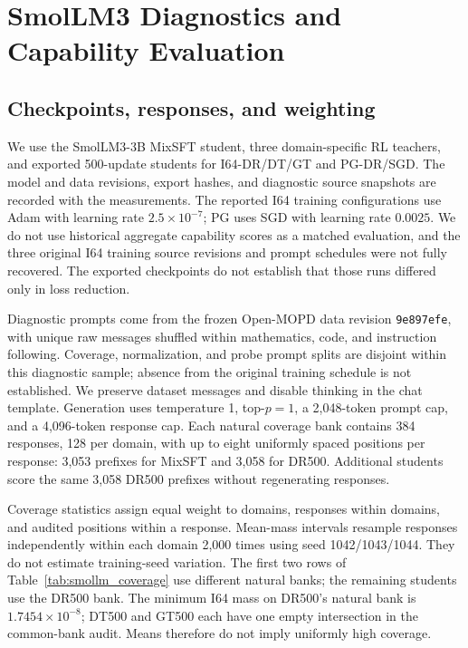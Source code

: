 \section{SmolLM3 Diagnostics and Capability Evaluation}
\label{app:smollm_diagnostics}

\subsection{Checkpoints, responses, and weighting}

We use the SmolLM3-3B MixSFT student, three domain-specific RL teachers, and exported 500-update students for I64-DR/DT/GT and PG-DR/SGD. The model and data revisions, export hashes, and diagnostic source snapshots are recorded with the measurements. The reported I64 training configurations use Adam with learning rate $2.5\times10^{-7}$; PG uses SGD with learning rate $0.0025$. We do not use historical aggregate capability scores as a matched evaluation, and the three original I64 training source revisions and prompt schedules were not fully recovered. The exported checkpoints do not establish that those runs differed only in loss reduction.

Diagnostic prompts come from the frozen Open-MOPD data revision \texttt{9e897efe}, with unique raw messages shuffled within mathematics, code, and instruction following. Coverage, normalization, and probe prompt splits are disjoint within this diagnostic sample; absence from the original training schedule is not established. We preserve dataset messages and disable thinking in the chat template. Generation uses temperature 1, top-$p=1$, a 2,048-token prompt cap, and a 4,096-token response cap. Each natural coverage bank contains 384 responses, 128 per domain, with up to eight uniformly spaced positions per response: 3,053 prefixes for MixSFT and 3,058 for DR500. Additional students score the same 3,058 DR500 prefixes without regenerating responses.

Coverage statistics assign equal weight to domains, responses within domains, and audited positions within a response. Mean-mass intervals resample responses independently within each domain 2,000 times using seed 1042/1043/1044. They do not estimate training-seed variation. The first two rows of Table~\ref{tab:smollm_coverage} use different natural banks; the remaining students use the DR500 bank. The minimum I64 mass on DR500's natural bank is $1.7454\times10^{-8}$; DT500 and GT500 each have one empty intersection in the common-bank audit. Means therefore do not imply uniformly high coverage.

